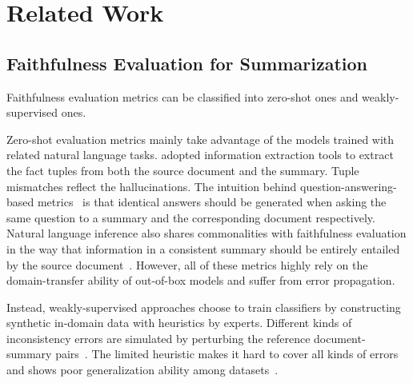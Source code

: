 \section{Related Work}
\label{sec:relatedwork}
\subsection{Faithfulness Evaluation for Summarization}


Faithfulness evaluation metrics can be classified into zero-shot ones and 
weakly-supervised ones.

Zero-shot evaluation metrics mainly take advantage of the models trained with related natural language tasks. \citet{goodrich2019assessing} adopted information extraction tools to extract the fact tuples from both the source document and the summary. Tuple mismatches reflect the hallucinations. The intuition behind question-answering-based metrics~\cite{wang2020asking,durmus2020feqa,scialom2021questeval} is that identical answers should be generated when asking the same question to a summary and the corresponding document respectively. 
Natural language inference also shares commonalities with faithfulness evaluation in the way that information in a consistent summary should be entirely entailed by the source document~\cite{falke2019ranking,mishra2021looking,laban2022summac}. 
However, all of these metrics highly rely on the domain-transfer ability of out-of-box models and suffer from error propagation.

Instead, weakly-supervised approaches choose to train classifiers by constructing synthetic in-domain data with heuristics by experts. Different kinds of inconsistency errors are simulated by perturbing the reference document-summary pairs~\cite{kryscinski2020evaluating,utama2022falsesum,yin2021docnli}. The limited heuristic makes it hard to cover all kinds of errors and shows poor generalization ability among datasets~\cite{laban2022summac}.

